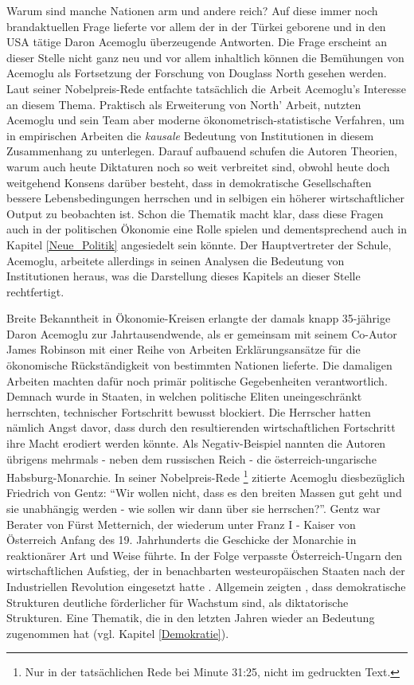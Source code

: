 Warum sind manche Nationen arm und andere reich? Auf diese immer noch brandaktuellen Frage lieferte vor allem der in der Türkei geborene und in den USA tätige Daron Acemoglu überzeugende Antworten. Die Frage erscheint an dieser Stelle nicht ganz neu und  vor allem inhaltlich können die Bemühungen von Acemoglu als Fortsetzung der Forschung von Douglass North gesehen werden. Laut seiner Nobelpreis-Rede \parencite[S. 3]{Acemoglu2024} entfachte tatsächlich die Arbeit \textcite{North1989} Acemoglu's Interesse an diesem Thema. Praktisch als Erweiterung von North' Arbeit, nutzten Acemoglu und sein Team aber moderne ökonometrisch-statistische Verfahren, um in empirischen Arbeiten die \textit{kausale} Bedeutung von Institutionen in diesem Zusammenhang zu unterlegen. Darauf aufbauend schufen die Autoren Theorien, warum auch heute Diktaturen noch so weit verbreitet sind, obwohl heute doch weitgehend Konsens darüber besteht, dass in demokratische Gesellschaften bessere Lebensbedingungen herrschen und in selbigen ein höherer wirtschaftlicher Output zu beobachten ist. Schon die Thematik macht klar, dass diese Fragen auch in der politischen Ökonomie eine Rolle spielen und dementsprechend auch in Kapitel \ref{Neue_Politik} angesiedelt sein könnte. Der Hauptvertreter der Schule, Acemoglu, arbeitete allerdings in seinen Analysen die Bedeutung von Institutionen heraus, was die Darstellung dieses Kapitels an dieser Stelle rechtfertigt.

Breite Bekanntheit in Ökonomie-Kreisen erlangte der damals knapp 35-jährige Daron Acemoglu zur Jahrtausendwende, als er gemeinsam mit seinem Co-Autor James Robinson mit einer Reihe von Arbeiten \parencite{Acemoglu2000, Acemoglu2000a, Acemoglu2006} Erklärungsansätze für die ökonomische Rückständigkeit von bestimmten Nationen lieferte. Die damaligen Arbeiten machten dafür noch primär politische Gegebenheiten verantwortlich. Demnach wurde in Staaten, in welchen politische Eliten uneingeschränkt herrschten, technischer Fortschritt bewusst blockiert. Die Herrscher hatten nämlich Angst davor, dass durch den resultierenden wirtschaftlichen Fortschritt ihre Macht erodiert werden könnte. Als Negativ-Beispiel nannten die Autoren übrigens mehrmals \parencite{Acemoglu2000, Acemoglu2012, Acemoglu2024} - neben dem russischen Reich - die österreich-ungarische Habsburg-Monarchie. In seiner Nobelpreis-Rede \parencite{Acemoglu2024}\footnote{Nur in der tatsächlichen Rede bei Minute 31:25, nicht im gedruckten Text.} zitierte Acemoglu diesbezüglich Friedrich von Gentz: "`Wir wollen nicht, dass es den breiten Massen gut geht und sie unabhängig werden - wie sollen wir dann über sie herrschen?"'. Gentz war Berater von Fürst Metternich, der wiederum unter Franz I - Kaiser von Österreich Anfang des 19. Jahrhunderts die Geschicke der Monarchie in reaktionärer Art und Weise führte. In der Folge verpasste Österreich-Ungarn den wirtschaftlichen Aufstieg, der in benachbarten westeuropäischen Staaten nach der Industriellen Revolution eingesetzt hatte \parencite{Acemoglu2000}. Allgemein zeigten \textcite{Acemoglu2006}, dass demokratische Strukturen deutliche förderlicher für Wachstum sind, als diktatorische Strukturen. Eine Thematik, die in den letzten Jahren wieder an Bedeutung zugenommen hat (vgl. Kapitel \ref{Demokratie}).


